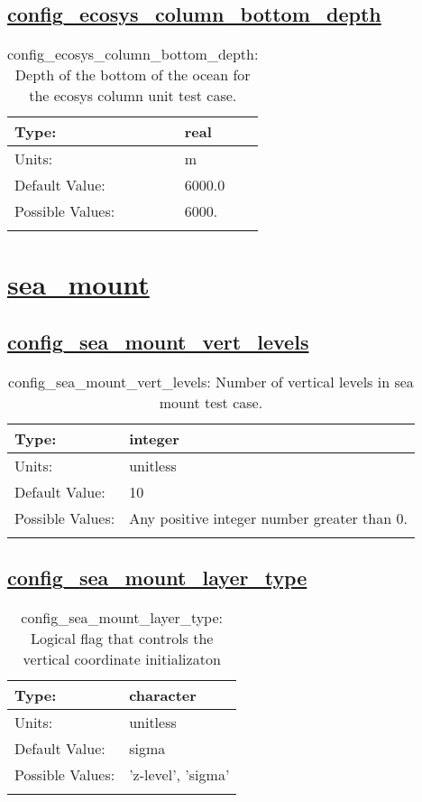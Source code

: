 \subsection[config\_ecosys\_column\_bottom\_depth]{\hyperref[sec:nm_tab_ecosys_column]{config\_ecosys\_column\_bottom\_depth}}
\label{subsec:nm_sec_config_ecosys_column_bottom_depth}
\begin{center}
\begin{longtable}{| p{2.0in} || p{4.0in} |}
    \hline
    Type: & real \\
    \hline
    Units: & \si{m} \\
    \hline
    Default Value: & 6000.0 \\
    \hline
    Possible Values: & 6000. \\
    \hline
    \caption{config\_ecosys\_column\_bottom\_depth: Depth of the bottom of the ocean for the ecosys column unit test case.}
\end{longtable}
\end{center}
\section[sea\_mount]{\hyperref[sec:nm_tab_sea_mount]{sea\_mount}}
\label{sec:nm_sec_sea_mount}
\subsection[config\_sea\_mount\_vert\_levels]{\hyperref[sec:nm_tab_sea_mount]{config\_sea\_mount\_vert\_levels}}
\label{subsec:nm_sec_config_sea_mount_vert_levels}
\begin{center}
\begin{longtable}{| p{2.0in} || p{4.0in} |}
    \hline
    Type: & integer \\
    \hline
    Units: & \si{unitless} \\
    \hline
    Default Value: & 10 \\
    \hline
    Possible Values: & Any positive integer number greater than 0. \\
    \hline
    \caption{config\_sea\_mount\_vert\_levels: Number of vertical levels in sea mount test case.}
\end{longtable}
\end{center}
\subsection[config\_sea\_mount\_layer\_type]{\hyperref[sec:nm_tab_sea_mount]{config\_sea\_mount\_layer\_type}}
\label{subsec:nm_sec_config_sea_mount_layer_type}
\begin{center}
\begin{longtable}{| p{2.0in} || p{4.0in} |}
    \hline
    Type: & character \\
    \hline
    Units: & \si{unitless} \\
    \hline
    Default Value: & sigma \\
    \hline
    Possible Values: & 'z-level', 'sigma' \\
    \hline
    \caption{config\_sea\_mount\_layer\_type: Logical flag that controls the vertical coordinate initializaton}
\end{longtable}
\end{center}
